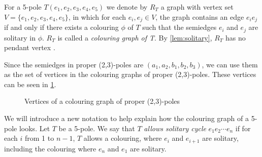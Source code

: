 For a 5-pole $T(e_1,e_2,e_3,e_4,e_5)$ we denote by $R_T$ a graph with vertex set\linebreak $V=\{e_1,e_2,e_3,e_4,e_5\}$, in which for each $e_i,e_j\in V$, the graph contains an edge $e_ie_j$ if and only if there exists a colouring $\phi$ of $T$ such that the semiedges $e_i$ and $e_j$ are solitary in $\phi$. $R_T$ is called a \textit{colouring graph of T}. By \cref{lem:solitary}, $R_T$ has no pendant vertex \cite{Preissmann1983}.

Since the semiedges in proper (2,3)-poles are $(a_1,a_2,b_1,b_2,b_3)$, we can use them as the set of vertices in the colouring graphs of proper (2,3)-poles. These vertices can be seen in \cref{fig:proper-associated-vertices}.

\begin{figure}
	\centering
	
	\caption{Vertices of a colouring graph of proper (2,3)-poles}
	\label{fig:proper-associated-vertices}
\end{figure}

We will introduce a new notation to help explain how the colouring graph of a 5-pole looks. Let $T$ be a 5-pole. We say that $T$ \textit{allows solitary cycle} $e_1e_2\cdots e_n$ if for each $i$ from 1 to $n-1$, $T$ allows a colouring, where $e_i$ and $e_{i+1}$ are solitary, including the colouring where $e_n$ and $e_1$ are solitary.

